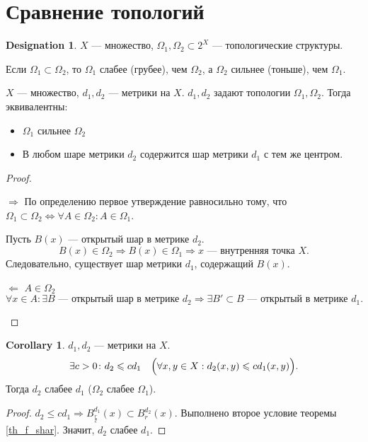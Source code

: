 \documentclass[11pt]{book}
\renewcommand{\le}{\leqslant}
\theoremstyle{definition}
\theoremstyle{plain}
\theoremstyle{plain}
\theoremstyle{definition}
\newtheorem*{cor}{Corollary}
\newtheorem*{name}{Designation}
\theoremstyle{remark}
\begin{document}
\section{Сравнение топологий}
\begin{name}
    $ X$ --- множество,  $ \Omega _1, \Omega _2 \subset 2^{X}$ --- топологические структуры.
\end{name}
\begin{defn}
    Если $ \Omega _1 \subset \Omega _2$, то $ \Omega _1$ слабее (грубее), чем $ \Omega _2$, а $ \Omega _2$ сильнее (тоньше), чем $ \Omega _1$.
\end{defn}
\begin{thm}\label{th_f_shar}
    $ X$ --- множество,  $ d_1, d_2$ --- метрики на $ X$.  $ d_1, d_2$ задают топологии $ \Omega _1, \Omega _2$.
    Тогда эквивалентны:
    \begin{itemize}
	\item $ \Omega _1$ сильнее $ \Omega _2$
	\item В любом шаре метрики $ d_2$ содержится шар метрики $ d_1$ с тем же центром.
    \end{itemize}
\end{thm}
\begin{proof}
    $ $
    \begin{description}
	\item $ \boxed{ \Longrightarrow }$ По определению  первое утверждение равносильно тому, что $ \Omega _1 \subset \Omega _2 \Longleftrightarrow \forall A \in \Omega _2: A \in \Omega _1$.

	    Пусть $ B(x)$ --- открытый шар в метрике  $ d_2$.
	    \[
		B(x) \in \Omega _2 \Longrightarrow B(x) \in \Omega _1 \Longrightarrow x \text{ --- внутренняя точка } X
	    .\]
	    Следовательно, существует шар метрики $ d_1$, содержащий $ B(x)$.
	\item $ \boxed{ \Longleftarrow  }$
	    $ A \in \Omega _2$
	    \[
		\forall x \in A \colon \exists B \text{ --- открытый шар в метрике } d_2 \Longrightarrow \exists B' \subset B \text{ --- открытый в метрике } d_1
	    .\]
    \end{description}
\end{proof}
\begin{cor}
    $ d_1, d_2$ --- метрики на $ X$.
    \[
	\exists c >0 \colon d_2 \le cd_1 \quad \Bigl( \forall x, y \in  X: d_2(x, y) \le c d_1(x, y)\Bigr)
    .\]
    Тогда $ d_2$ слабее $ d_1$ ($ \Omega _2$ слабее $ \Omega _1$).
\end{cor}
\begin{proof}
    $ d_2 \le cd_1 \Longrightarrow B_{\frac{r}{c}}^{d_1}(x) \subset B_r^{d_2}(x) $. Выполнено второе условие теоремы \ref{th_f_shar}. Значит,  $ d_2 $ слабее $ d_1$.
\end{proof}
\end{document}
